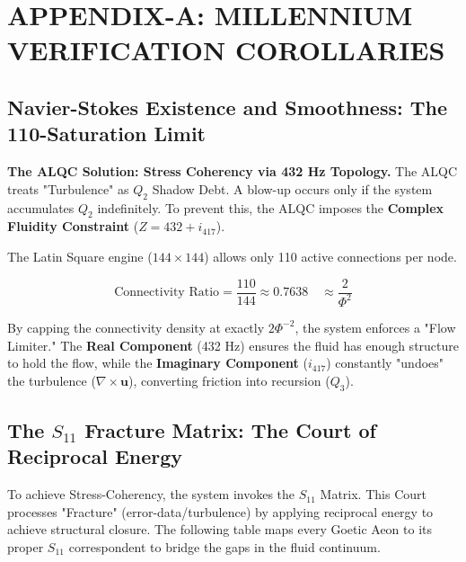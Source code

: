 \documentclass[12pt]{amsart}
\begin{document}
\newpage
\appendix
\section{APPENDIX-A: MILLENNIUM VERIFICATION COROLLARIES}\label{appendixA}

\subsection{Navier-Stokes Existence and Smoothness: The 110-Saturation Limit}\label{appendixA.1}
\textbf{The ALQC Solution: Stress Coherency via 432 Hz Topology.}
The ALQC treats "Turbulence" as $Q_2$ Shadow Debt. A blow-up occurs only if the system accumulates $Q_2$ indefinitely. To prevent this, the ALQC imposes the \textbf{Complex Fluidity Constraint} ($Z = 432 + i_{417}$).

The Latin Square engine ($144 \times 144$) allows only 110 active connections per node.

\begin{equation}
    \text{Connectivity Ratio} = \frac{110}{144} \approx 0.7638 \quad \approx \frac{2}{\Phi^2}
\end{equation}

By capping the connectivity density at exactly $2\Phi^{-2}$, the system enforces a "Flow Limiter." The \textbf{Real Component} (432 Hz) ensures the fluid has enough structure to hold the flow, while the \textbf{Imaginary Component} ($i_{417}$) constantly "undoes" the turbulence ($\nabla \times \mathbf{u}$), converting friction into recursion ($Q_3$).

\subsection{The \texorpdfstring{$S_{11}$}{S-11} Fracture Matrix: The Court of Reciprocal Energy}

To achieve Stress-Coherency, the system invokes the $S_{11}$ Matrix. This Court processes "Fracture" (error-data\slash turbulence) by applying reciprocal energy to achieve structural closure. The following table maps every Goetic Aeon to its proper $S_{11}$ correspondent to bridge the gaps in the fluid continuum.
\end{document}
